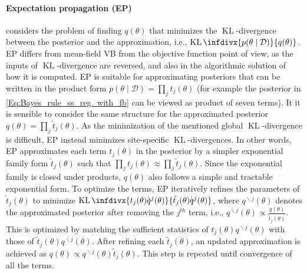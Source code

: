 \documentclass[dissertation,math,vertlayout,pdfa,colorlinks]{aaltoseries}
\newcommand{\bD}{\mathcal{D}}
\DeclareMathOperator{\KLt}{KL}
\newcommand{\KL}{\KLt\infdivx}
\begin{document}
\paragraph{Expectation propagation (EP)} \cite{minka2001expectation} considers the problem of finding $q(\theta)$ that minimizes the $\KLt$-divergence between the posterior and the approximation, i.e., $\KL{p(\theta \mid \bD)}{q(\theta)}$. EP differs from mean-field VB from the objective function point of view, as the inputs of $\KLt$-divergence are reversed, and also in the algorithmic solution of how it is computed. %
EP is suitable for approximating posteriors that can be written in the product form %
$p(\theta \mid \bD) = \prod_{j} t_j(\theta)$ (for example the posterior in \ref{Eq:Bayes_rule_ss_reg_with_fb} can be viewed as product of seven terms). It it is sensible to consider the same structure for the approximated posterior $q(\theta) = \prod_{j} \tilde{t}_j(\theta)$. %
As the minimization of the mentioned global $\KLt$-divergence is difficult, EP instead minimizes site-specific $\KLt$-divergences. In other words, EP approximates each term $t_j(\theta)$ in the posterior by a simpler exponential family form $\tilde{t}_j(\theta)$ such that $\prod_{j} t_j(\theta) \approx \prod_{j}\tilde{t}_j(\theta)$. Since the exponential family is closed under products, $q(\theta)$ also follows a simple and tractable exponential form. To optimize the terms, EP iteratively refines the parameters of $\tilde{t}_j(\theta)$ to minimize $\KL{t_j(\theta) q^{\!\!\!\backslash j}(\theta)} {\tilde{t}_j(\theta) q^{\!\!\!\backslash j}(\theta)}$, where $q^{\!\!\!\backslash j}(\theta)$ denotes the approximated posterior after removing the $j^{th}$ term, i.e.,  $q^{\!\!\!\backslash j}(\theta) \propto \frac{q(\theta)}{\tilde{t}_j(\theta)}$. This is optimized by matching the sufficient statistics of $t_j(\theta) q^{\!\!\!\backslash j}(\theta)$ with those of $\tilde{t}_j(\theta) q^{\!\!\!\backslash j}(\theta)$. After refining each $\tilde{t}_j(\theta)$, an updated approximation is achieved as $q(\theta)\propto q^{\!\!\!\backslash j}(\theta) \tilde{t}_j(\theta)$. This step is repeated until convergence of all the terms. \cite{hernandez2013generalized,Lobato2015ML,Tomi_P_thesis}
	
\end{document}

